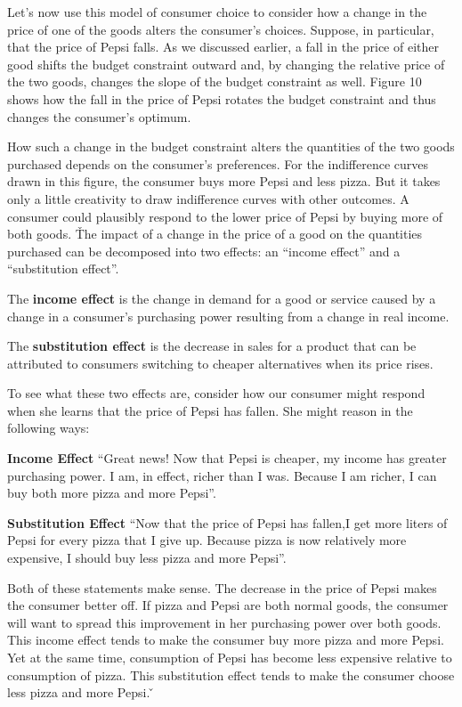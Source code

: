 
Let's now use this model of consumer choice to consider how a change in the price of one of the goods alters the
consumer's choices. Suppose, in particular, that the price of Pepsi falls. As we discussed earlier, a fall in the
price of either good shifts the budget constraint outward and, by changing the relative price of the two goods,
changes the slope of the budget constraint as well. Figure 10 shows how the fall in the price of Pepsi rotates the
budget constraint and thus changes the consumer's optimum.


How such a change in the budget constraint alters the quantities of the two goods purchased depends on the consumer's
preferences. For the indifference curves drawn in this figure, the consumer buys more Pepsi and less pizza. But it
takes only a little creativity to draw indifference curves with other outcomes. A consumer could plausibly respond to
the lower price of Pepsi by buying more of both goods. \v

The impact of a change in the price of a good on the quantities purchased can be decomposed into two effects: an
``income effect'' and a ``substitution effect''.

The \textbf{income effect} is the change in demand for a good or service caused by a change in a consumer's
purchasing power resulting from a change in real income.
\ed

The \textbf{substitution effect} is the decrease in sales for a product that can be attributed to consumers switching
to cheaper alternatives when its price rises.
\ed

To see what these two effects are, consider how our consumer might respond when she learns that the price of Pepsi
has fallen. She might reason in the following ways:
\bit
\item \textbf{Income Effect} ``Great news! Now that Pepsi is cheaper, my income has greater purchasing power. I am, in
effect, richer than I was. Because I am richer, I can buy both more pizza and more Pepsi''.
\item \textbf{Substitution Effect} ``Now that the price of Pepsi has fallen,I get more liters of Pepsi for every pizza
that I give up. Because pizza is now relatively more expensive, I should buy less pizza and more Pepsi''.
\eit

Both of these statements make sense. The decrease in the price of Pepsi makes the consumer better off. If pizza and
Pepsi are both normal goods, the consumer will want to spread this improvement in her purchasing power over both
goods. This income effect tends to make the consumer buy more pizza and more Pepsi. Yet at the same time, consumption
of Pepsi has become less expensive relative to consumption of pizza. This substitution effect tends to make the
consumer choose less pizza and more Pepsi. \v

